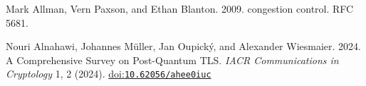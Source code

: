 \documentclass[sigconf,9pt,nonacm]{acmart}
\begin{document}
\begin{thebibliography}{25}


\ifx \showCODEN    \undefined {}     \fi
\ifx \showISBNx    \undefined \def \showISBNx     #1{\unskip}     \fi
\ifx \showISBNxiii \undefined \def \showISBNxiii  #1{\unskip}     \fi
\ifx \showISSN     \undefined \def \showISSN      #1{\unskip}     \fi
\ifx \showLCCN     \undefined \def \showLCCN      #1{\unskip}     \fi
\ifx \shownote     \undefined \def \shownote      #1{#1}          \fi
\ifx \showarticletitle \undefined \def \showarticletitle #1{#1}   \fi
\ifx \showURL      \undefined \def \showURL       {\relax}        \fi
\providecommand\bibfield[2]{#2}
\providecommand\bibinfo[2]{#2}
\providecommand\natexlab[1]{#1}
\providecommand\showeprint[2][]{arXiv:#2}
\makeatletter
{}
\makeatother

\bibfield{author}{\bibinfo{person}{Mark Allman}, \bibinfo{person}{Vern Paxson},
  {and} \bibinfo{person}{Ethan Blanton}.} \bibinfo{year}{2009}\natexlab{}.
\newblock \bibinfo{title}{{TCP} congestion control}.
\newblock \bibinfo{howpublished}{{IETF} RFC 5681}.
\newblock


\bibfield{author}{\bibinfo{person}{Nouri Alnahawi}, \bibinfo{person}{Johannes
  M{\"u}ller}, \bibinfo{person}{Jan Oupick{\'y}}, {and}
  \bibinfo{person}{Alexander Wiesmaier}.} \bibinfo{year}{2024}\natexlab{}.
\newblock \showarticletitle{A Comprehensive Survey on Post-Quantum {TLS}}.
\newblock \bibinfo{journal}{\emph{IACR Communications in Cryptology}}
  \bibinfo{volume}{1}, \bibinfo{number}{2} (\bibinfo{year}{2024}).
\newblock
\href{https://doi.org/10.62056/ahee0iuc}{doi:\nolinkurl{10.62056/ahee0iuc}}



\end{thebibliography}
\end{document}
